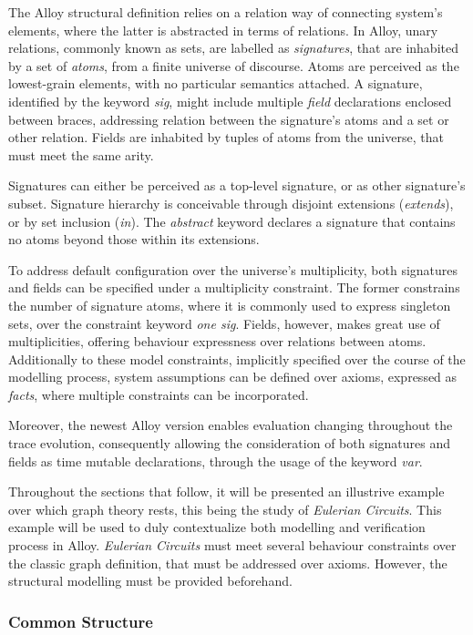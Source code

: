 The Alloy structural definition relies on a relation way of connecting system's elements, where the latter is abstracted in terms of relations. In Alloy, unary relations, commonly known as sets, are labelled as \textit{signatures}, that are inhabited by a set of \textit{atoms}, from a finite universe of discourse. Atoms are perceived as the lowest-grain elements, with no particular semantics attached. A signature, identified by the keyword \textit{sig}, might include multiple \textit{field} declarations enclosed between braces, addressing relation between the signature's atoms and a set or other relation. Fields are inhabited by tuples of atoms from the universe, that must meet the same arity.

Signatures can either be perceived as a top-level signature, or as other signature's subset. Signature hierarchy is conceivable through disjoint extensions (\textit{extends}), or by set inclusion (\textit{in}). The \textit{abstract} keyword declares a signature that contains no atoms beyond those within its extensions. 

To address default configuration over the universe's multiplicity, both signatures and fields can be specified under a multiplicity constraint. The former constrains the number of signature atoms, where it is commonly used to express singleton sets, over the constraint keyword \textit{one sig}. Fields, however, makes great use of multiplicities, offering behaviour expressness over relations between atoms. Additionally to these model constraints, implicitly specified over the course of the modelling process, system assumptions can be defined over axioms, expressed as \textit{facts}, where multiple constraints can be incorporated.

Moreover, the newest Alloy version enables evaluation changing throughout the trace evolution, consequently allowing the consideration of both signatures and fields as time mutable declarations, through the usage of the keyword \textit{var}.

Throughout the sections that follow, it will be presented an illustrive example over which graph theory rests, this being the study of \textit{Eulerian Circuits}. This example will be used to duly contextualize both modelling and verification process in Alloy. \textit{Eulerian Circuits} must meet several behaviour constraints over the classic graph definition, that must be addressed over axioms. However, the structural modelling must be provided beforehand.

\subsubsection{Common Structure}


